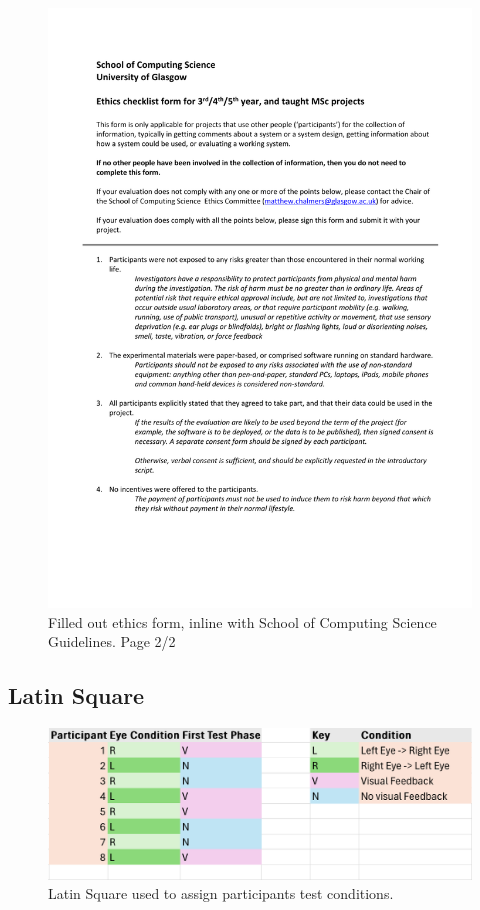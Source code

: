 \documentclass{l4proj}
\begin{document}
\begin{appendices}
\begin{figure}[htbp]
    \includegraphics[page=2,width=0.8\linewidth]{dissertation/images/Ethics.pdf}   
    \caption{Filled out ethics form, inline with School of Computing Science Guidelines. Page 2/2}
\end{figure}
\newpage
\subsection{Latin Square} \label{appendix:latin_square}
\begin{figure}[htbp]
    \centering
    \includegraphics[width=0.9\linewidth]{dissertation/images/Latin Square.png}   
    \caption{Latin Square used to assign participants test conditions.}
\end{figure}
\newpage

\end{appendices}
\end{document}
